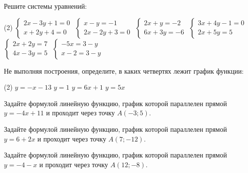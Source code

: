 \begin{class}[number=3]
	\begin{listofex}
		\item Решите системы уравнений:
		\begin{tasks}(2)
			\task \( \begin{cases} 2x-3y+1=0 \\ x+2y+4=0 \end{cases} \)
			\task \( \begin{cases} x-y=-1 \\ 2x-2y+3=0 \end{cases} \)
			\task \( \begin{cases} 2x+y=-2 \\ 6x+3y=-6 \end{cases} \)
			\task \( \begin{cases} 3x+4y-1=0 \\ 2x+5y=5 \end{cases} \)
			\task \( \begin{cases} 2x+2y=7 \\ 4x-3y=5 \end{cases} \)
			\task \( \begin{cases} -5x=3-y \\ x-2=3-y \end{cases} \)
		\end{tasks}
		\item Не выполняя построения, определите, в каких четвертях лежит график функции:
		\begin{tasks}(2)
			\task \( y=-x-13 \)
			\task \( y=1 \)
			\task \( y=6x+1 \)
			\task \( y=5x \)
		\end{tasks}
		\item Задайте формулой линейную функцию, график которой параллелен прямой \(y=-4x+11\) и проходит через точку \(A(- 3; 5)\).
		\item Задайте формулой линейную функцию, график которой параллелен прямой \(y=6+2x\) и проходит через точку \(A(7; -12)\).
		\item Задайте формулой линейную функцию, график которой параллелен прямой \(y=-4-x\) и проходит через точку \(A(12; -8)\).
	\end{listofex}
\end{class}

